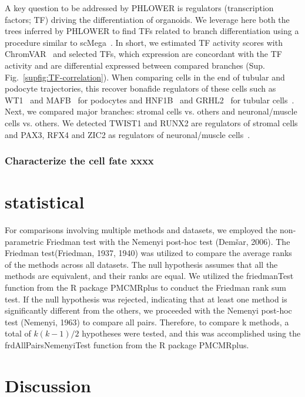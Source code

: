 A key question to be addressed by PHLOWER is regulators (transcription factors; TF) driving the differentiation of organoids. We leverage here both the trees inferred by PHLOWER to find TFs related to branch differentiation using a procedure similar to scMega~\citep{li2023scmega}. In short, we estimated TF activity scores with ChromVAR~\citep{schep2017chromvar} and selected TFs, which expression are concordant with the TF activity and are differential expressed between compared branches (Sup. Fig.~\ref{supfig:TF-correlation}). When comparing cells in the end of tubular and podocyte trajectories, this recover bonafide regulators of these cells such as WT1~\citep{kann2015genome} and MAFB~\citep{schreibing2022mapping} for podocytes and HNF1B~\citep{kompatscher2017loss} and GRHL2~\cite{aue2015grainyhead} for tubular cells~. Next, we compared major branches: stromal cells vs. others and neuronal/muscle cells vs. others. We detected TWIST1 and RUNX2 are regulators of stromal cells and PAX3, RFX4 and ZIC2 as regulators of neuronal/muscle cells~.


\subsubsection{Characterize the cell fate xxxx}

\section{statistical}
\label{PHLOWER_bench:statistical}

For comparisons involving multiple methods and datasets, we employed the non-parametric Friedman test with the Nemenyi post-hoc test (Demšar, 2006). The Friedman test(Friedman, 1937, 1940) was utilized to compare the average ranks of the methods across all datasets. The null hypothesis assumes that all the methods are equivalent, and their ranks are equal. We utilized the friedmanTest function from the R package PMCMRplus to conduct the Friedman rank sum test. If the null hypothesis was rejected, indicating that at least one method is significantly different from the others, we proceeded with the Nemenyi post-hoc test (Nemenyi, 1963) to compare all pairs. Therefore, to compare k methods, a total of $k(k-1)/2$ hypotheses were tested, and this was accomplished using the frdAllPairsNemenyiTest function from the R package PMCMRplus.



\section{Discussion}
\label{PHLOWER_bench:discussion}

